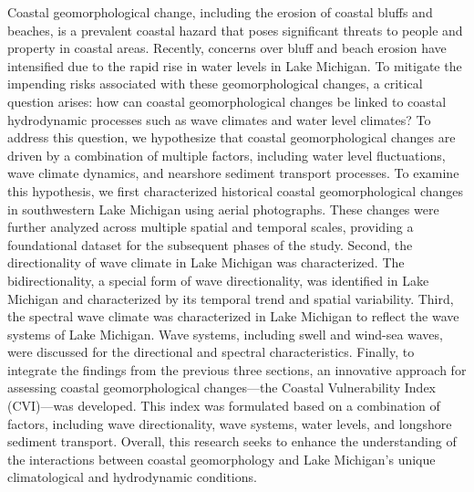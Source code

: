 Coastal geomorphological change, including the erosion of coastal bluffs and
beaches, is a prevalent coastal hazard that poses significant threats to people
and property in coastal areas. Recently, concerns over bluff and beach erosion
have intensified due to the rapid rise in water levels in Lake Michigan. To
mitigate the impending risks associated with these geomorphological changes, a
critical question arises: how can coastal geomorphological changes be linked to
coastal hydrodynamic processes such as wave climates and water level climates?
To address this question, we hypothesize that coastal geomorphological changes
are driven by a combination of multiple factors, including water level
fluctuations, wave climate dynamics, and nearshore sediment transport processes.
To examine this hypothesis, we first characterized historical coastal
geomorphological changes in southwestern Lake Michigan using aerial photographs.
These changes were further analyzed across multiple spatial and temporal scales,
providing a foundational dataset for the subsequent phases of the study. Second,
the directionality of wave climate in Lake Michigan was characterized. The
bidirectionality, a special form of wave directionality, was identified in Lake
Michigan and characterized by its temporal trend and spatial variability. Third,
the spectral wave climate was characterized in Lake Michigan to reflect the wave
systems of Lake Michigan. Wave systems, including swell and wind-sea waves, were
discussed for the directional and spectral characteristics. Finally, to
integrate the findings from the previous three sections, an innovative approach
for assessing coastal geomorphological changes—the Coastal Vulnerability Index
(CVI)—was developed. This index was formulated based on a combination of
factors, including wave directionality, wave systems, water levels, and
longshore sediment transport. Overall, this research seeks to enhance the
understanding of the interactions between coastal geomorphology and Lake
Michigan’s unique climatological and hydrodynamic conditions.